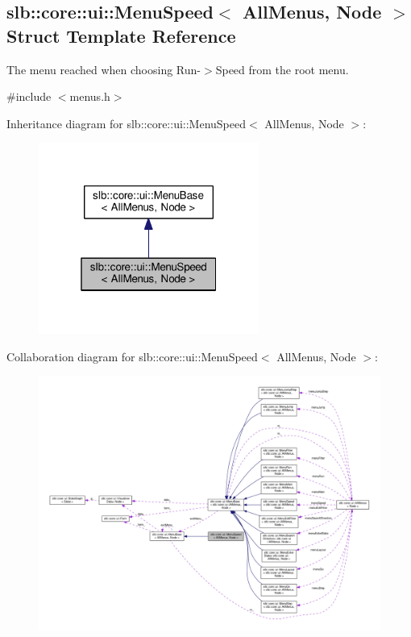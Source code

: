 \hypertarget{structslb_1_1core_1_1ui_1_1MenuSpeed}{}\subsection{slb\+:\+:core\+:\+:ui\+:\+:Menu\+Speed$<$ All\+Menus, Node $>$ Struct Template Reference}
\label{structslb_1_1core_1_1ui_1_1MenuSpeed}


The menu reached when choosing Run-\/$>$Speed from the root menu.  




{\ttfamily \#include $<$menus.\+h$>$}



Inheritance diagram for slb\+:\+:core\+:\+:ui\+:\+:Menu\+Speed$<$ All\+Menus, Node $>$\+:\nopagebreak
\begin{figure}[H]
\begin{center}
\leavevmode
\includegraphics[width=205pt]{structslb_1_1core_1_1ui_1_1MenuSpeed__inherit__graph}
\end{center}
\end{figure}


Collaboration diagram for slb\+:\+:core\+:\+:ui\+:\+:Menu\+Speed$<$ All\+Menus, Node $>$\+:\nopagebreak
\begin{figure}[H]
\begin{center}
\leavevmode
\includegraphics[width=350pt]{structslb_1_1core_1_1ui_1_1MenuSpeed__coll__graph}
\end{center}
\end{figure}
